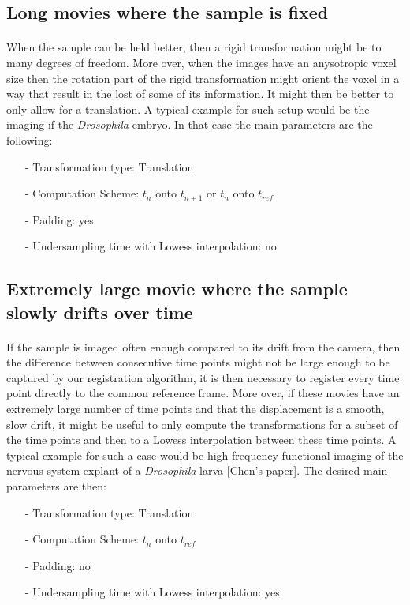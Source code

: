 \documentclass[10pt,a4paper]{article}
\begin{document}
\subsection{Long movies where the sample is fixed}
\paragraph{}When the sample can be held better, then a rigid transformation might be to many degrees of freedom. More over, when the images have an anysotropic voxel size then the rotation part of the rigid transformation might orient the voxel in a way that result in the lost of some of its information. It might then be better to only allow for a translation. A typical example for such setup would be the imaging if the \textit{Drosophila} embryo. In that case the main parameters are the following:
	\begin{itemize}
		\item[-] Transformation type: Translation
		\item[-] Computation Scheme: $t_n$ onto $t_{n\pm 1}$ or $t_n$ onto $t_{ref}$
		\item[-] Padding: yes
		\item[-] Undersampling time with Lowess interpolation: no
	\end{itemize}
\subsection{Extremely large movie where the sample slowly drifts over time}
\paragraph{}If the sample is imaged often enough compared to its drift from the camera, then the difference between consecutive time points might not be large enough to be captured by our registration algorithm, it is then necessary to register every time point directly to the common reference frame. More over, if these movies have an extremely large number of time points and that the displacement is a smooth, slow drift, it might be useful to only compute the transformations for a subset of the time points and then to a Lowess interpolation between these time points. A typical example for such a case would be high frequency functional imaging of the nervous system explant of a \textit{Drosophila} larva [Chen's paper]. The desired main parameters are then:
	\begin{itemize}
		\item[-] Transformation type: Translation
		\item[-] Computation Scheme: $t_n$ onto $t_{ref}$
		\item[-] Padding: no
		\item[-] Undersampling time with Lowess interpolation: yes
	\end{itemize}
\end{document}

